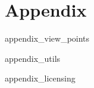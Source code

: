 \chapter{Appendix}
\label{sec:appendix}

 {appendix_view_points}

 {appendix_utils}

 {appendix_licensing} 

